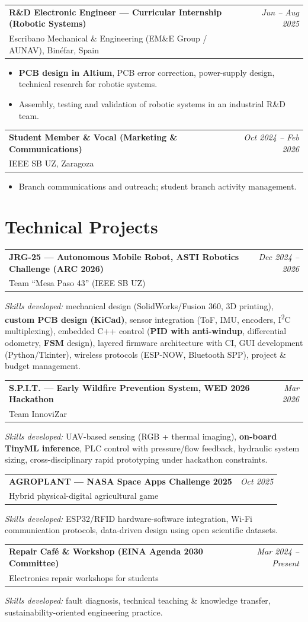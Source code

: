 \documentclass[10pt,a4paper]{article}
\makeatletter
\newcommand{\entry}[4]{%
  \noindent\begin{tabularx}{\textwidth}{@{}X r@{}}
    \textbf{#1} & \textit{\small #2}\\
    \textcolor{cvgray}{\small #3} & \textcolor{cvgray}{\small #4}\\
  \end{tabularx}\par\vspace{0.5pt}
}
\makeatother
\begin{document}
\entry{R\&D Electronic Engineer --- Curricular Internship (Robotic Systems)}{Jun -- Aug 2025}
      {Escribano Mechanical \& Engineering (EM\&E Group / AUNAV), Binéfar, Spain}{}
\begin{itemize}
  \item \textbf{PCB design in Altium}, PCB error correction, power-supply design, technical research for robotic systems.
  \item Assembly, testing and validation of robotic systems in an industrial R\&D team.
\end{itemize}

\entry{Student Member \& Vocal (Marketing \& Communications)}{Oct 2024 -- Feb 2026}
      {IEEE SB UZ, Zaragoza}{}
\begin{itemize}
  \item Branch communications and outreach; student branch activity management.
\end{itemize}

\section*{Technical Projects}
\entry{JRG-25 --- Autonomous Mobile Robot, ASTI Robotics Challenge (ARC 2026)}{Dec 2024 -- 2026}
      {Team ``Mesa Paso 43'' (IEEE SB UZ)}{}
\textit{Skills developed:} mechanical design (SolidWorks/Fusion 360, 3D printing), \textbf{custom PCB design (KiCad)}, sensor integration (ToF, IMU, encoders, I\textsuperscript{2}C multiplexing), embedded C++ control (\textbf{PID with anti-windup}, differential odometry, \textbf{FSM} design), layered firmware architecture with CI, GUI development (Python/Tkinter), wireless protocols (ESP-NOW, Bluetooth SPP), project \& budget management.

\entry{S.P.I.T. --- Early Wildfire Prevention System, WED 2026 Hackathon}{Mar 2026}
      {Team InnoviZar}{}
\textit{Skills developed:} UAV-based sensing (RGB + thermal imaging), \textbf{on-board TinyML inference}, PLC control with pressure/flow feedback, hydraulic system sizing, cross-disciplinary rapid prototyping under hackathon constraints.

\entry{AGROPLANT --- NASA Space Apps Challenge 2025}{Oct 2025}
      {Hybrid physical-digital agricultural game}{}
\textit{Skills developed:} ESP32/RFID hardware-software integration, Wi-Fi communication protocols, data-driven design using open scientific datasets.

\entry{Repair Café \& Workshop (EINA Agenda 2030 Committee)}{Mar 2024 -- Present}
      {Electronics repair workshops for students}{}
\textit{Skills developed:} fault diagnosis, technical teaching \& knowledge transfer, sustainability-oriented engineering practice.
\end{document}
